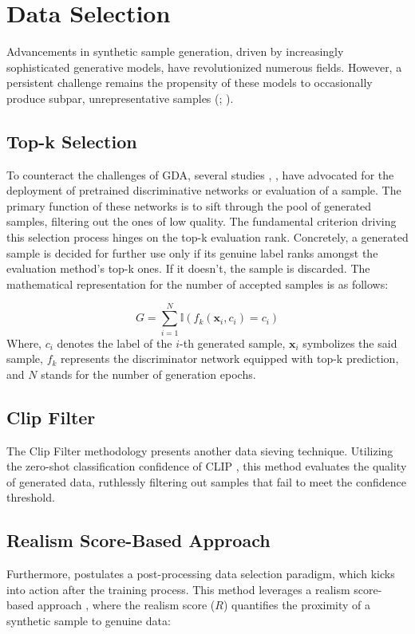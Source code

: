 \documentclass[preprint,12pt,authoryear]{elsarticle}
\begin{document}
\section{Data Selection}

Advancements in synthetic sample generation, driven by increasingly sophisticated generative models, have revolutionized numerous fields. However, a persistent challenge remains the propensity of these models to occasionally produce subpar, unrepresentative samples (\cite{152_data_selection}; \cite{153_data_selection}). 

\subsection{Top-k Selection}
To counteract the challenges of GDA, several studies \cite{9_labelling_diffusion}, \cite{155_top_selection},\cite{173_segmentation} have advocated for the deployment of pretrained discriminative networks or evaluation of a sample. The primary function of these networks is to sift through the pool of generated samples, filtering out the ones of low quality. The fundamental criterion driving this selection process hinges on the top-k evaluation rank. Concretely, a generated sample is decided for further use only if its genuine label ranks amongst the evaluation method's top-k ones. If it doesn't, the sample is discarded. The mathematical representation for the number of accepted samples is as follows:

\begin{equation} 
\label{eq6} 
G=\sum_{i=1}^N{\mathbb{I} \left( f_k\left( \boldsymbol{x}_i,c_i \right) =c_i \right)} 
\end{equation}
Where, $c_i$ denotes the label of the $i$-th generated sample, $\boldsymbol{x}_i$ symbolizes the said sample, $f_k$ represents the discriminator network equipped with top-k prediction, and $N$ stands for the number of generation epochs.

\subsection{Clip Filter}
The Clip Filter methodology \cite{151_synthetic_ready} presents another data sieving technique. Utilizing the zero-shot classification confidence of CLIP \cite{156_CLIP}, this method evaluates the quality of generated data, ruthlessly filtering out samples that fail to meet the confidence threshold.

\subsection{Realism Score-Based Approach}
Furthermore, \cite{104_direct_use} postulates a post-processing data selection paradigm, which kicks into action after the training process. This method leverages a realism score-based approach \citep{154_realism}, where the realism score ($R$) quantifies the proximity of a synthetic sample to genuine data:
\end{document}
